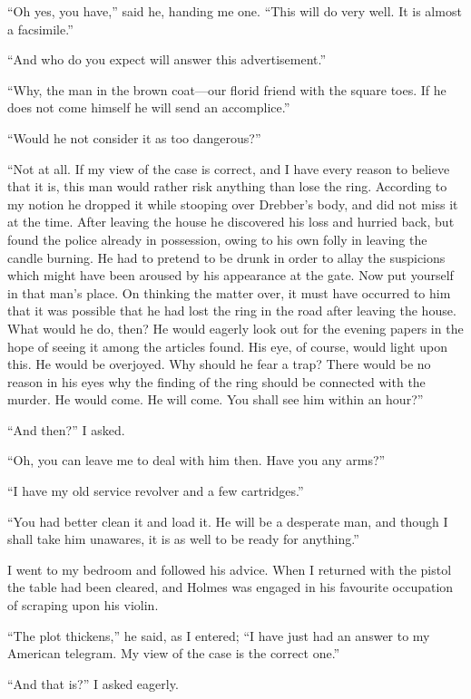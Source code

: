 \documentclass[12pt,english,oneside]{book}
\newcommand{\mdsh}[1]{\mbox{#1}\linebreak[1]}
\begin{document}
{}``Oh yes, you have,'' said he, handing me one. {}``This will
do very well. It is almost a facsimile.''

{}``And who do you expect will answer this advertisement.''

{}``Why, the man in the brown coat\mdsh{---}our florid friend with
the square toes. If he does not come himself he will send an accomplice.''

{}``Would he not consider it as too dangerous?''

{}``Not at all. If my view of the case is correct, and I have every
reason to believe that it is, this man would rather risk anything
than lose the ring. According to my notion he dropped it while stooping
over Drebber's body, and did not miss it at the time. After leaving
the house he discovered his loss and hurried back, but found the police
already in possession, owing to his own folly in leaving the candle
burning. He had to pretend to be drunk in order to allay the suspicions
which might have been aroused by his appearance at the gate. Now put
yourself in that man's place. On thinking the matter over, it must
have occurred to him that it was possible that he had lost the ring
in the road after leaving the house. What would he do, then? He would
eagerly look out for the evening papers in the hope of seeing it among
the articles found. His eye, of course, would light upon this. He
would be overjoyed. Why should he fear a trap? There would be no reason
in his eyes why the finding of the ring should be connected with the
murder. He would come. He will come. You shall see him within an hour?''

{}``And then?'' I asked.

{}``Oh, you can leave me to deal with him then. Have you any arms?''

{}``I have my old service revolver and a few cartridges.''

{}``You had better clean it and load it. He will be a desperate man,
and though I shall take him unawares, it is as well to be ready for
anything.''

I went to my bedroom and followed his advice. When I returned with
the pistol the table had been cleared, and Holmes was engaged in his
favourite occupation of scraping upon his violin.

{}``The plot thickens,'' he said, as I entered; {}``I have just
had an answer to my American telegram. My view of the case is the
correct one.''

{}``And that is?'' I asked eagerly.
\end{document}
